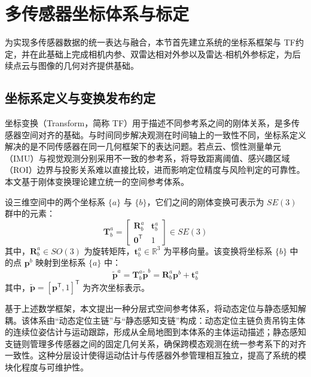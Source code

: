 \section{多传感器坐标体系与标定}\label{sec:multi_sensor_coord_calib}

为实现多传感器数据的统一表达与融合，本节首先建立系统的坐标系框架与 TF约定，并在此基础上完成相机内参、双雷达相对外参以及雷达‑相机外参标定，为后续点云与图像的几何对齐提供基础。

\subsection{坐标系定义与变换发布约定}\label{ux5750ux6807ux7cfbux4e0e-tf-ux63a5ux53e3ux89c4ux8303}


坐标变换（Transform，简称 TF）用于描述不同参考系之间的刚体关系，是多传感器空间对齐的基础。与时间同步解决观测在时间轴上的一致性不同，坐标系定义解决的是不同传感器在同一几何框架下的表达问题。若点云、惯性测量单元（IMU）与视觉观测分别采用不一致的参考系，将导致距离阈值、感兴趣区域（ROI）边界与投影关系难以直接比较，进而影响定位精度与风险判定的可靠性。本文基于刚体变换理论建立统一的空间参考体系。

设三维空间中的两个坐标系 $\{a\}$ 与 $\{b\}$，它们之间的刚体变换可表示为 $SE(3)$ 群中的元素：
\begin{equation}
\mathbf{T}_b^a = \begin{bmatrix}
\mathbf{R}_b^a & \mathbf{t}_b^a \\
\mathbf{0}^{\mathsf{T}} & 1
\end{bmatrix} \in SE(3)
\end{equation}
其中，$\mathbf{R}_b^a \in SO(3)$ 为旋转矩阵，$\mathbf{t}_b^a \in \mathbb{R}^3$ 为平移向量。该变换将坐标系 $\{b\}$ 中的点 $\mathbf{p}^b$ 映射到坐标系 $\{a\}$ 中：
\begin{equation}
\tilde{\mathbf{p}}^a = \mathbf{T}_b^a \tilde{\mathbf{p}}^b = \mathbf{R}_b^a \mathbf{p}^b + \mathbf{t}_b^a
\end{equation}
其中，$\tilde{\mathbf{p}} = [\mathbf{p}^{\mathsf{T}}, 1]^{\mathsf{T}}$ 为齐次坐标表示。

基于上述数学框架，本文提出一种分层式空间参考体系，将动态定位与静态感知解耦。该体系由“动态定位主链”与“静态感知支链”构成：动态定位主链负责吊钩主体的连续位姿估计与运动跟踪，形成从全局地图到本体系的主体运动描述；静态感知支链则管理多传感器之间的固定几何关系，确保跨模态观测在统一参考系下的对齐一致性。这种分层设计使得运动估计与传感器外参管理相互独立，提高了系统的模块化程度与可维护性。

